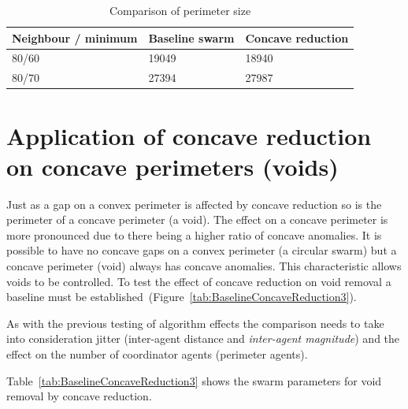 \documentclass{ieeeaccess}
\begin{document}
\begin{table}
\caption{Comparison of perimeter size} 
\label{tab:BaselineConcaveComparison}
\begin{center}
\begin{tabular}{| p{2.3cm} | p{2cm} | p{2cm} |}
\hline
\bf Neighbour / minimum & \bf Baseline \bf swarm & \bf Concave \bf reduction \\ \hline
80/60 & 19049 & 18940 \\  \hline
80/70 & 27394 & 27987 \\  \hline
\end{tabular}
\end{center}
\end{table}

\section{Application of concave reduction on concave perimeters (voids)}\label{sec:ApplicationConcavePerimeters}
Just as a gap on a convex perimeter is affected by concave reduction so is the perimeter of a concave perimeter (a void). The effect on a concave perimeter is more pronounced due to there being a higher ratio of concave anomalies. It is possible to have no concave gaps on a convex perimeter (a circular swarm) but a concave perimeter (void) always has concave anomalies. This characteristic allows voids to be controlled. To test the effect of concave reduction on void removal a baseline must be established~(Figure~\ref{tab:BaselineConcaveReduction3}).

As with the previous testing of algorithm effects the comparison needs to take into consideration jitter (inter-agent distance and \textit{inter-agent magnitude}) and the effect on the number of coordinator agents (perimeter agents). 

Table~\ref{tab:BaselineConcaveReduction3} shows the swarm parameters for void removal by concave reduction.
\end{document}
